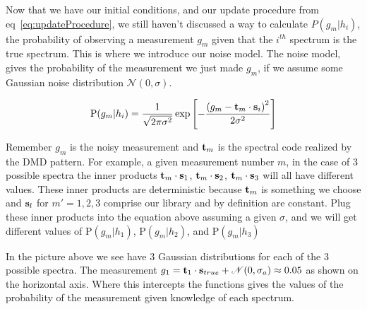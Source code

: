 Now that we have our initial conditions, and our update procedure from eq~\ref{eq:updateProcedure}, we still haven't discussed a way to calculate $P(g_m|{h}_i)$, the probability of observing a measurement $g_m$ given that the $i^{th}$ spectrum is the true spectrum. This is where we introduce our noise model. The noise model, gives the probability of the measurement we just made $g_m$, if we assume some Gaussian noise distribution $\mathscr{N}(0,\sigma)$.

\begin{equation}\label{eq:noiseModel}
    \mbox{P}(g_m|{h}_i)
    =
    \frac
    {
        1
    }
    {
        \sqrt{2\pi \sigma^2}
    }
    \exp{
    \left[
        -
        \frac
        {
        \left( g_m - \mathbf{t}_m \cdot \mathbf{s}_i \right)^2
        }
        {
        2 \sigma^2
        }
    \right]
    }
\end{equation}

Remember $g_m$ is the noisy measurement and $\mathbf{t}_m$ is the spectral code realized by the DMD pattern. For example, a given measurement number $m$, in the case of 3 possible spectra the inner products $\mathbf{t}_m \cdot \mathbf{s}_1$, $\mathbf{t}_m \cdot \mathbf{s}_2$, $\mathbf{t}_m \cdot \mathbf{s}_3 $ will all have different values. These inner products are deterministic because $\mathbf{t}_m$ is something we choose and $\mathbf{s}_l$ for $m' = 1,2,3$ comprise our library and by definition are constant. Plug these inner products into the equation above assuming a given $\sigma$, and we will get different values of $\mbox{P}(g_m | h_1)$, $\mbox{P}(g_m | h_2)$, and $\mbox{P}(g_m | h_3)$


In the picture above we see have 3 Gaussian distributions for each of the 3 possible spectra. The measurement $g_1 = \mathbf{t}_1 \cdot \mathbf{s}_{true} + \mathscr{N}(0,\sigma_a) \approx 0.05$ as shown on the horizontal axis. Where this intercepts the functions gives the values of the probability of the measurement given knowledge of each spectrum.

